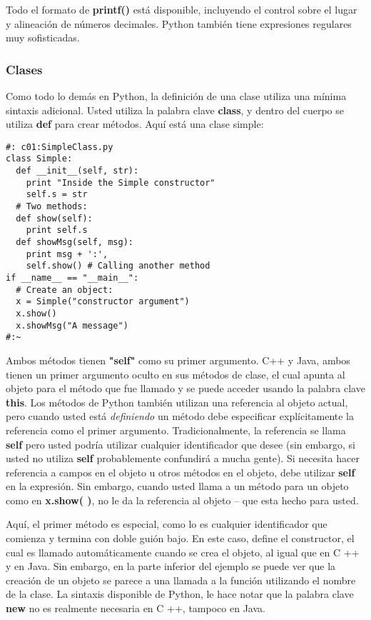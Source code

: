 Todo el formato de \textbf{printf()} está disponible, incluyendo el control sobre el lugar y alineación de números decimales. Python también tiene expresiones regulares muy sofisticadas.

\newpage

\subsubsection*{Clases}
\label{subsubsec:class}

Como todo lo demás en Python, la definición de una clase utiliza una mínima sintaxis adicional. Usted utiliza la palabra clave \textbf{class}, y dentro del cuerpo se utiliza \textbf{def} para crear métodos. Aquí está una clase simple: \newline

\begin{lstlisting}
#: c01:SimpleClass.py
class Simple: 
  def __init__(self, str): 
    print "Inside the Simple constructor" 
    self.s = str 
  # Two methods: 
  def show(self): 
    print self.s 
  def showMsg(self, msg): 
    print msg + ':', 
    self.show() # Calling another method 
if __name__ == "__main__": 
  # Create an object: 
  x = Simple("constructor argument") 
  x.show() 
  x.showMsg("A message") 
#:~ 
\end{lstlisting}

Ambos métodos tienen \textbf{"self"} como su primer argumento. C++ y Java, ambos tienen un primer argumento oculto en sus métodos de clase, el cual apunta al objeto para el método que fue llamado y se puede acceder usando la palabra clave \textbf{this}. Los métodos de Python también utilizan una referencia al objeto actual, pero cuando usted está \textit{definiendo} un método debe especificar explícitamente la referencia como el primer argumento. Tradicionalmente, la referencia se llama \textbf{self} pero usted podría utilizar cualquier identificador que desee (sin embargo, si usted no utiliza \textbf{self} probablemente confundirá a mucha gente). Si necesita hacer referencia a campos en el objeto u otros métodos en el objeto, debe utilizar \textbf{self} en la expresión. Sin embargo, cuando usted llama a un método para un objeto como en \textbf{x.show( )}, no le da la referencia al objeto – que esta hecho para usted.\newline

Aquí, el primer método es especial, como lo es cualquier identificador que comienza y termina con doble guión bajo. En este caso, define el constructor, el cual es llamado automáticamente cuando se crea el objeto, al igual que en C ++ y en Java. Sin embargo, en la parte inferior del ejemplo se puede ver que la creación de un objeto se parece a una llamada a la función utilizando el nombre de la clase. La sintaxis disponible de Python, le hace notar que la palabra clave \textbf{new} no es realmente necesaria en C ++, tampoco en Java. \newline

